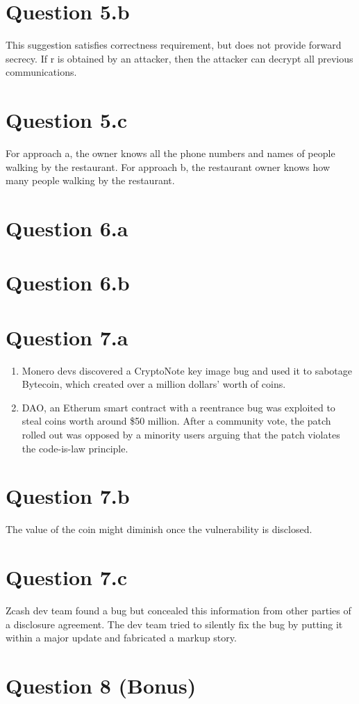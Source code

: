 \documentclass{article}
\begin{document}
\section{Question 5.b}
This suggestion satisfies correctness requirement, but does not provide forward secrecy. If r is obtained by an attacker, then the attacker can decrypt all previous communications.
\newpage

\section{Question 5.c}
For approach a, the owner knows all the phone numbers and names of people walking by the restaurant. For approach b, the restaurant owner knows how many people walking by the restaurant.
\newpage

\section{Question 6.a}

\newpage

\section{Question 6.b}

\newpage

\section{Question 7.a}
\begin{enumerate}
    \item Monero devs discovered a CryptoNote key image bug and used it to sabotage Bytecoin, which created over a million dollars' worth of coins.
    \item DAO, an Etherum smart contract with a reentrance bug was exploited to steal coins worth around \$50 million. After a community vote, the patch rolled out was opposed by a minority users arguing that the patch violates the code-is-law principle.
\end{enumerate}
\newpage

\section{Question 7.b}
The value of the coin might diminish once the vulnerability is disclosed.
\newpage

\section{Question 7.c}
Zcash dev team found a bug but concealed this information from other parties of a disclosure agreement. The dev team tried to silently fix the bug by putting it within a major update and fabricated a markup story.
\newpage

\section{Question 8 (Bonus)}
\end{document}

